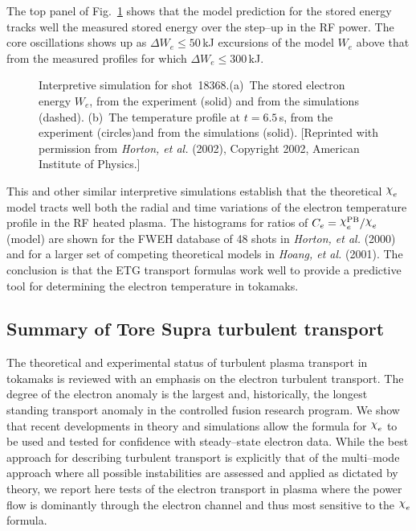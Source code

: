 \documentclass[a4paper,openany,12pt]{book}
\def\chix{\raise.5ex\hbox{$\chi$}}
\begin{document}
The top panel of Fig.~\ref{F9.11} shows that the model prediction for the stored energy tracks well the measured stored energy over the step--up in the RF power. The core oscillations shows up as $\Delta W_e\le 50\,$kJ excursions of the model $W_e$ above that from the measured profiles for which $\Delta W_e\le 300\,$kJ.
%
\begin{figure}[H]
\centerline{}
\caption{Interpretive simulation for shot~18368.(a)~The stored electron energy 
$W_e$, from the experiment (solid) and from the simulations (dashed). (b)~The
temperature profile at $t=6.5\,$s, from the experiment (circles)and
from the simulations (solid). [Reprinted with permission from \emph{Horton, et al.} (2002), Copyright 2002, American Institute of Physics.]}
\label{F9.11}
\end{figure}
%

This and other similar interpretive simulations establish that the theoretical 
$\chix_e$ model tracts well both the radial and time variations of the electron temperature profile in the RF heated plasma. The histograms for ratios of $C_e=\chix_e^{\rm PB}/\chix_e$ (model) are shown for the FWEH database of 48 shots in \emph{Horton, et al.} (2000) and for a larger set of competing theoretical models in \emph{Hoang, et al.} (2001). The conclusion is that the ETG transport formulas work well to provide a predictive tool for determining the electron temperature in tokamaks.

\subsection{Summary of Tore Supra turbulent transport}

The theoretical and experimental status of turbulent plasma transport in tokamaks is reviewed with an emphasis on the electron turbulent transport. The degree of the electron anomaly is the largest and, historically, the longest standing transport anomaly in the controlled fusion research program. We show that recent developments in theory and simulations allow the formula for $\chix_e$ to be used and tested for confidence with steady--state electron data. While the best approach for describing turbulent transport is explicitly that of the multi--mode approach where all possible instabilities are assessed and applied as dictated by theory, we report here tests of the electron transport in plasma where the power flow is dominantly through the electron channel and thus most sensitive to the $\chix_e$ formula. 
\end{document}
